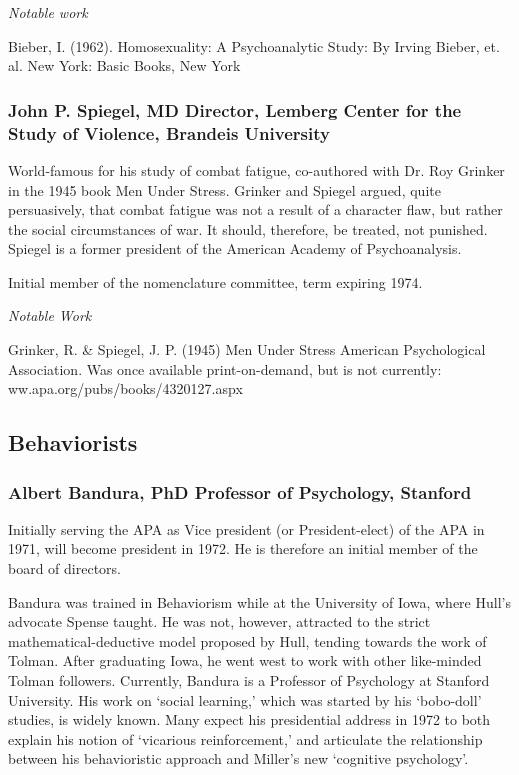 \emph{Notable work}

Bieber, I. (1962). Homosexuality: A Psychoanalytic Study: By Irving Bieber, et. al. New York: Basic Books, New York

\subsubsection{John P. Spiegel, MD Director, Lemberg Center for the Study of Violence, Brandeis University}
\label{johnp.spiegelmddirectorlembergcenterforthestudyofviolencebrandeisuniversity}

World-famous for his study of combat fatigue, co-authored with Dr. Roy Grinker in the 1945 book Men Under Stress. Grinker and Spiegel argued, quite persuasively, that combat fatigue was not a result of a character flaw, but rather the social circumstances of war. It should, therefore, be treated, not punished. Spiegel is a former president of the American Academy of Psychoanalysis.

Initial member of the nomenclature committee, term expiring 1974.

\emph{Notable Work}

Grinker, R. \& Spiegel, J. P. (1945) Men Under Stress American Psychological Association. Was once available print-on-demand, but is not currently: ww.apa.org\slash pubs\slash books\slash 4320127.aspx

\subsection{Behaviorists}
\label{behaviorists}

\subsubsection{Albert Bandura, PhD Professor of Psychology, Stanford}
\label{albertbanduraphdprofessorofpsychologystanford}

Initially serving the APA as Vice president (or President-elect) of the APA in 1971, will become president in 1972. He is therefore an initial member of the board of directors.

Bandura was trained in Behaviorism while at the University of Iowa, where Hull's advocate Spense taught. He was not, however, attracted to the strict mathematical-deductive model proposed by Hull, tending towards the work of Tolman. After graduating Iowa, he went west to work with other like-minded Tolman followers. Currently, Bandura is a Professor of Psychology at Stanford University. His work on `social learning,' which was started by his `bobo-doll' studies, is widely known. Many expect his presidential address in 1972 to both explain his notion of `vicarious reinforcement,' and articulate the relationship between his behavioristic approach and Miller's new `cognitive psychology'.

